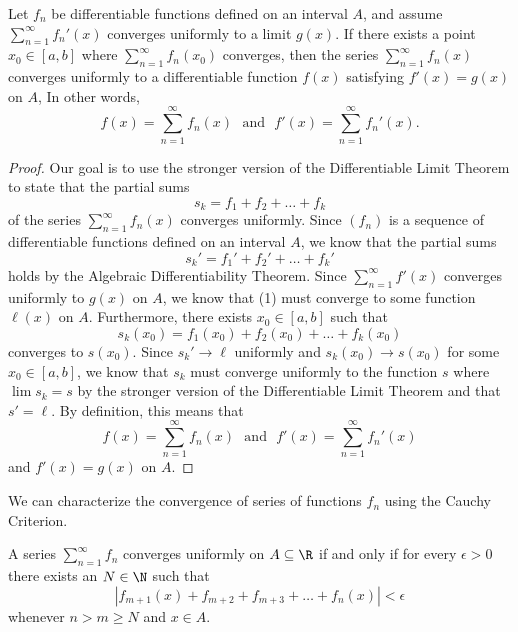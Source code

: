 \begin{tcolorbox}
    \begin{thm}
        Let \( f_n  \) be differentiable functions defined on an interval \( A  \), and assume \( \sum_{ n=1 }^{ \infty  } f_n'(x)  \) converges uniformly to a limit \( g(x) \). If there exists a point \( x_0 \in [a,b]  \) where \( \sum_{ n=1 }^{ \infty  } f_n(x_0)  \) converges, then the series \( \sum_{ n=1 }^{ \infty  } f_n(x)  \) converges uniformly to a differentiable function \( f(x)  \) satisfying \( f'(x)  = g(x)  \) on \( A  \), In other words, 
        \[  f(x) = \sum_{ n=1 }^{ \infty  } f_n(x) \text{ ~and~ } f'(x) = \sum_{ n=1 }^{ \infty  } f_n'(x).  \] 
    \end{thm}
\end{tcolorbox}

\begin{proof}
Our goal is to use the stronger version of the Differentiable Limit Theorem to state that the partial sums 
\[  s_k = f_1 + f_2 + \dots + f_k  \]
of the series \( \sum_{ n=1 }^{ \infty  } f_n(x)  \) converges uniformly. Since \( (f_n)  \) is a sequence of differentiable functions defined on an interval \( A  \), we know that the partial sums 
\[  s_k' = f_1'  + f_2' + \dots + f_k' \tag{1}\]
holds by the Algebraic Differentiability Theorem. Since \( \sum_{ n=1 }^{ \infty  } f'(x) \) converges uniformly to \( g(x)  \) on \( A  \), we know that (1) must converge to some function \( \ell(x)  \) on \( A  \). Furthermore, there exists \(  x_0 \in [a,b] \) such that 
\[  s_k(x_0)  = f_1(x_0) + f_2(x_0) + \dots + f_k(x_0) \] converges to \( s(x_0)  \).
Since \( s_k' \to \ell \) uniformly and \( s_k(x_0) \to s(x_0)  \) for some \( x_0 \in [a,b]  \), we know that \( s_k  \) must converge uniformly to the function \( s  \) where \( \lim s_k = s  \) by the stronger version of the Differentiable Limit Theorem and that \( s' = \ell  \). By definition, this means that 
\[  f(x) = \sum_{ n=1 }^{ \infty  } f_n(x) \text{ ~and~ } f'(x) = \sum_{ n=1 }^{ \infty  } f_n'(x) \]
and \( f'(x) = g(x)  \) on \( A  \).
\end{proof}

We can characterize the convergence of series of functions \( f_n \) using the Cauchy Criterion.

\begin{tcolorbox}
    \begin{thm}
    A series \( \sum_{ n=1 }^{ \infty  } f_n  \) converges uniformly on \( A \subseteq \R  \) if and only if for every \( \epsilon > 0  \) there exists an \( N \in \N  \) such that 
    \[  | f_{m+1}(x) + f_{m+2} + f_{m+3} + \dots + f_n(x)  | < \epsilon \]
    whenever \( n > m \geq N  \) and \( x \in A  \).
    \end{thm}
\end{tcolorbox}

